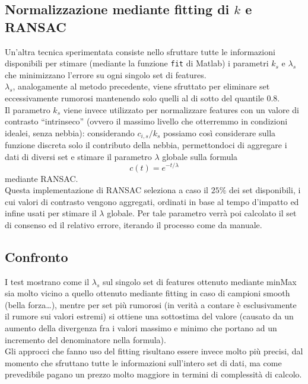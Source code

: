 \documentclass[12pt]{report}
\begin{document}
\subsection{Normalizzazione mediante fitting di $k$ e RANSAC}
\noindent Un'altra tecnica sperimentata consiste nello sfruttare tutte le informazioni disponibili  per stimare (mediante la funzione \verb|fit| di Matlab) i parametri $k_s$ e $\lambda_s$ che minimizzano l'errore su ogni singolo set di features.\\
$\lambda_s$, analogamente al metodo precedente, viene sfruttato per eliminare set eccessivamente rumorosi mantenendo solo quelli al di sotto del quantile $0.8$.\\
Il parametro $k_s$ viene invece utilizzato per normalizzare features con un valore di contrasto ``intrinseco'' (ovvero il massimo livello che otterremmo in condizioni idealei, senza nebbia): considerando $c_{i,s}/k_s$ possiamo cos\`i considerare sulla funzione discreta solo il contributo della nebbia, permettondoci di aggregare i dati di diversi set e stimare il parametro $\lambda$ globale sulla formula $$ c(t) = e^{-t/\lambda} $$ mediante RANSAC.\\
Questa implementazione di RANSAC seleziona a caso il $25\%$ dei set disponibili, i cui valori di contrasto vengono aggregati, ordinati in base al tempo d'impatto ed infine usati per stimare il $\lambda$ globale. Per tale parametro verrà poi calcolato il set di consenso ed il relativo errore, iterando il processo come da manuale.

\subsection{Confronto}
\noindent I test mostrano come il $\lambda_s$ sul singolo set di features ottenuto mediante minMax sia molto vicino a quello ottenuto mediante fitting in caso di campioni smooth (bella forza\dots), mentre per set pi\`u rumorosi (in verit\`a a contare \`e esclusivamente il rumore sui valori estremi) si ottiene una sottostima del valore (causato da un aumento della divergenza fra i valori massimo e minimo che portano ad un incremento del denominatore nella formula).\\
Gli approcci che fanno uso del fitting risultano essere invece molto pi\`u precisi, dal momento che sfruttano tutte le informazioni sull'intero set di dati, ma come prevedibile pagano un prezzo molto maggiore in termini di complessit\`a di calcolo.
\end{document}
